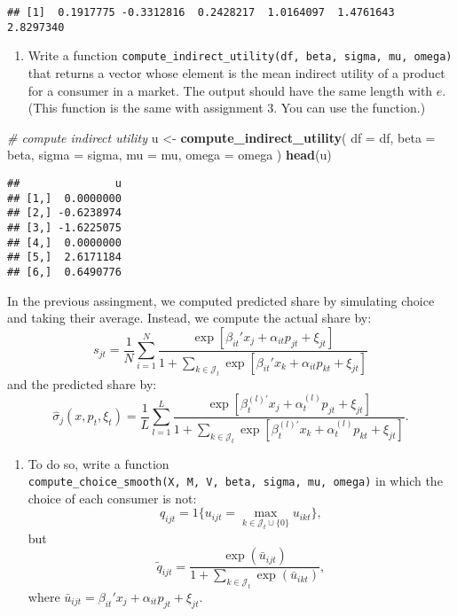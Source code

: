\documentclass[
]{book}
\newenvironment{Shaded}{\begin{snugshade}}{\end{snugshade}}
\newcommand{\AttributeTok}[1]{\textcolor[rgb]{0.13,0.29,0.53}{#1}}
\newcommand{\CommentTok}[1]{\textcolor[rgb]{0.56,0.35,0.01}{\textit{#1}}}
\newcommand{\FunctionTok}[1]{\textcolor[rgb]{0.13,0.29,0.53}{\textbf{#1}}}
\newcommand{\NormalTok}[1]{#1}
\newcommand{\OtherTok}[1]{\textcolor[rgb]{0.56,0.35,0.01}{#1}}
\providecommand{\tightlist}{%
  \setlength{\itemsep}{0pt}\setlength{\parskip}{0pt}}
\begin{document}
\begin{verbatim}
## [1]  0.1917775 -0.3312816  0.2428217  1.0164097  1.4761643  2.8297340
\end{verbatim}

\begin{enumerate}
\def\labelenumi{\arabic{enumi}.}
\setcounter{enumi}{6}
\tightlist
\item
  Write a function \texttt{compute\_indirect\_utility(df,\ beta,\ sigma,\ mu,\ omega)} that returns a vector whose element is the mean indirect utility of a product for a consumer in a market. The output should have the same length with \(e\). (This function is the same with assignment 3. You can use the function.)
\end{enumerate}

\begin{Shaded}
\begin{Highlighting}[]
\CommentTok{\# compute indirect utility}
\NormalTok{u }\OtherTok{\textless{}{-}} 
  \FunctionTok{compute\_indirect\_utility}\NormalTok{(}
    \AttributeTok{df =}\NormalTok{ df, }
    \AttributeTok{beta =}\NormalTok{ beta, }
    \AttributeTok{sigma =}\NormalTok{ sigma, }
    \AttributeTok{mu =}\NormalTok{ mu, }
    \AttributeTok{omega =}\NormalTok{ omega}
\NormalTok{    )}
\FunctionTok{head}\NormalTok{(u)}
\end{Highlighting}
\end{Shaded}

\begin{verbatim}
##               u
## [1,]  0.0000000
## [2,] -0.6238974
## [3,] -1.6225075
## [4,]  0.0000000
## [5,]  2.6171184
## [6,]  0.6490776
\end{verbatim}

In the previous assingment, we computed predicted share by simulating choice and taking their average. Instead, we compute the actual share by:
\[
s_{jt} = \frac{1}{N} \sum_{i = 1}^N \frac{\exp[\beta_{it}' x_j + \alpha_{it} p_{jt} + \xi_{jt}]}{1 + \sum_{k \in \mathcal{J}_t} \exp[\beta_{it}' x_k + \alpha_{it} p_{kt} + \xi_{jt}]}
\]
and the predicted share by:
\[
\widehat{\sigma}_{j}(x, p_t, \xi_t) = \frac{1}{L} \sum_{l = 1}^L \frac{\exp[\beta_{t}^{(l)\prime} x_j + \alpha_{t}^{(l)} p_{jt} + \xi_{jt}]}{1 + \sum_{k \in \mathcal{J}_t} \exp[\beta_{t}^{(l)\prime} x_k + \alpha_{t}^{(l)} p_{kt} + \xi_{jt}]}.
\]

\begin{enumerate}
\def\labelenumi{\arabic{enumi}.}
\setcounter{enumi}{7}
\tightlist
\item
  To do so, write a function \texttt{compute\_choice\_smooth(X,\ M,\ V,\ beta,\ sigma,\ mu,\ omega)} in which the choice of each consumer is not:
  \[
  q_{ijt} = 1\{u_{ijt} = \max_{k \in \mathcal{J}_t \cup \{0\}} u_{ikt}\},
  \]
  but
  \[
  \tilde{q}_{ijt} = \frac{\exp(\bar{u}_{ijt})}{1 + \sum_{k \in \mathcal{J}_t} \exp(\bar{u}_{ikt})},
  \]
  where \(\bar{u}_{ijt} = \beta_{it}' x_j + \alpha_{it} p_{jt} + \xi_{jt}\).
\end{enumerate}
\end{document}
